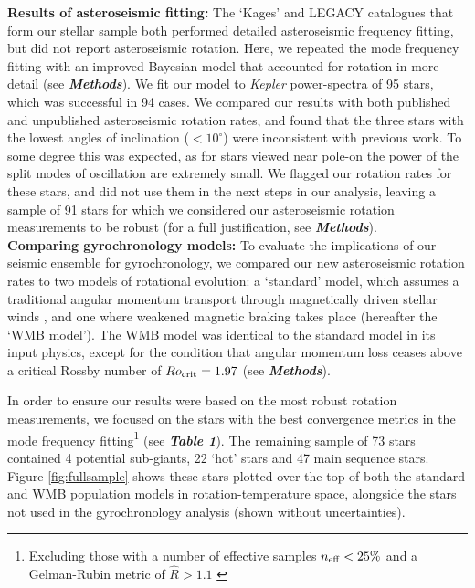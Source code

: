 \documentclass[12pt]{article}
\newcommand{\kepler}{\emph{Kepler}\xspace}
\begin{document}
\textbf{Results of asteroseismic fitting:} The `Kages' and LEGACY catalogues that form our stellar sample both performed detailed asteroseismic frequency fitting, but did not report asteroseismic rotation. Here, we repeated the mode frequency fitting with an improved Bayesian model that accounted for rotation in more detail (see \textbf{\textit{Methods}}). We fit our model to \kepler power-spectra of 95 stars, which was successful in 94 cases. We compared our results with both published and unpublished asteroseismic rotation rates, and found that the three stars with the lowest angles of inclination ($< 10^\circ$) were inconsistent with previous work. To some degree this was expected, as  for stars viewed near pole-on the power of the split modes of oscillation are extremely small. We flagged our rotation rates for these stars, and did not use them in the next steps in our analysis, leaving a sample of 91 stars for which we considered our asteroseismic rotation measurements to be robust (for a full justification, see \textit{\textbf{Methods}}).\\

\textbf{Comparing gyrochronology models:} To evaluate the implications of our seismic ensemble for gyrochronology, we compared our new asteroseismic rotation rates to two models of rotational evolution: a `standard' model, which assumes a traditional angular momentum transport through magnetically driven stellar winds \cite{skumanich1972, kawaler1988}, and one where weakened magnetic braking takes place (hereafter the `WMB model'). The WMB model was identical to the standard model in its input physics, except for the condition that angular momentum loss ceases above a critical Rossby number of $Ro_{\rm crit} = 1.97$ (see \textbf{\textit{Methods}}).

In order to ensure our results were based on the most robust rotation measurements, we focused on the stars with the best convergence metrics in the mode frequency fitting\footnote{Excluding those with a number of effective samples $n_{\rm eff} < 25\%$ and a Gelman-Rubin metric of $\hat{R}>1.1$ \cite{gelman+rubin1992,salvatier+2016}} (see \textbf{\textit{Table 1}}). The remaining sample of 73 stars contained 4 potential sub-giants, 22 `hot' stars and 47 main sequence stars. Figure \ref{fig:fullsample} shows these stars plotted over the top of both the standard and WMB population models in rotation-temperature space, alongside the stars not used in the gyrochronology analysis (shown without uncertainties).
\end{document}
